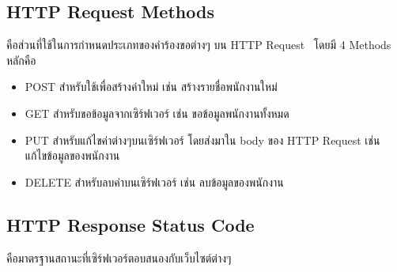 \subsection{HTTP Request Methods}

คือส่วนที่ใช้ในการกำหนดประเภทของคำร้องขอต่างๆ บน HTTP Request~\cite{Guru99} โดยมี 4 Methods หลักคือ 

\begin{itemize}
  \item POST สำหรับใช้เพื่อสร้างค่าใหม่ เช่น สร้างรายชื่อพนักงานใหม่
  \item GET สำหรับขอข้อมูลจากเซิร์ฟเวอร์ เช่น ขอข้อมูลพนักงานทั้งหมด
  \item PUT สำหรับแก้ไขค่าต่างๆบนเซิร์ฟเวอร์ โดยส่งมาใน body ของ HTTP Request เช่น แก้ไขข้อมูลของพนักงาน
  \item DELETE สำหรับลบค่าบนเซิร์ฟเวอร์ เช่น ลบข้อมูลของพนักงาน
\end{itemize}

\subsection{HTTP Response Status Code}

คือมาตรฐานสถานะที่เซิร์ฟเวอร์ตอบสนองกับเว็บไซต์ต่างๆ~\cite{httpResponse}

